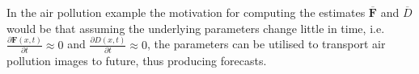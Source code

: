 In the air pollution example the motivation for computing the estimates $\overline{\mathbf{F}}$ and $\overline{D}$ would be that assuming the underlying parameters change little in time, i.e.\ $\frac{\partial \mathbf{F}(x,t)}{\partial t} \approx 0$ and $\frac{\partial D(x,t)}{\partial t} \approx 0$, the parameters can be utilised to transport air pollution images to future, thus producing forecasts.
